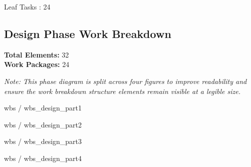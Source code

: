     Leaf Tasks : 24

\subsection {
  Design Phase Work Breakdown
}

\noindent\textbf { Total Elements: }
32
\\\textbf { Work Packages: }
24

\vspace {
  0.5em
}

\noindent\textit {
Note:
  This phase diagram is split across four figures to
      improve readability and ensure the work breakdown structure elements
          remain visible at a legible size.
}

 { wbs / wbs_design_part1 }

\newpage
 { wbs / wbs_design_part2 }

\newpage
 { wbs / wbs_design_part3 }

\newpage
 { wbs / wbs_design_part4 }

